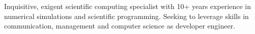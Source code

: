 \documentclass[10pt,a4paper,ragged2e]{../altacv}
\begin{document}

\begin{fullwidth}
\makecvheader

\vspace{-5mm}
\parbox{.7\paperwidth}{%
Inquisitive, exigent scientific computing specialist with 10+ years experience in numerical simulations and scientific programming. Seeking to leverage skills in communication, management and computer science as
developer engineer.
}

\end{fullwidth}


\end{document}
